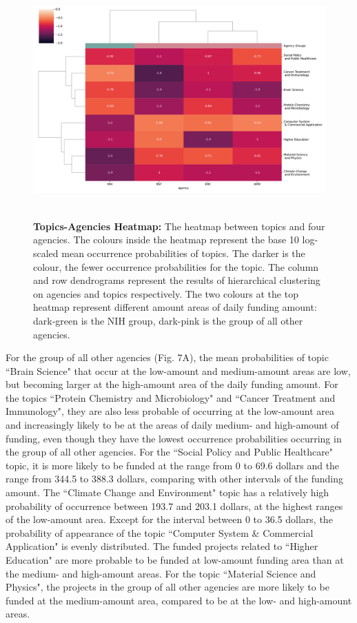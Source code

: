 \begin{figure}[H]
    \centering
    \includegraphics[width = 16cm, height = 9cm]{Code/img/heatmap_agency_topics.pdf}
    \caption[Heatmap between topic and agencies]{\textbf{Topics-Agencies Heatmap:} The heatmap between topics and four agencies. The colours inside the heatmap represent the base 10 log-scaled mean occurrence probabilities of topics. The darker is the colour, the fewer occurrence probabilities for the topic. The column and row dendrograms represent the results of hierarchical clustering on agencies and topics respectively. The two colours at the top heatmap represent different amount areas of daily funding amount: dark-green is the NIH group, dark-pink is the group of all other agencies.}
\end{figure}

For the group of all other agencies (Fig. 7A), the mean probabilities of topic ``Brain Science" that occur at the low-amount and medium-amount areas are low, but becoming larger at the high-amount area of the daily funding amount. For the topics ``Protein Chemistry and Microbiology" and ``Cancer Treatment and Immunology", they are also less probable of occurring at the low-amount area and increasingly likely to be at the areas of daily medium- and high-amount of funding, even though they have the lowest occurrence probabilities occurring in the group of all other agencies. For the ``Social Policy and Public Healthcare" topic, it is more likely to be funded at the range from 0 to 69.6 dollars and the range from 344.5 to 388.3 dollars, comparing with other intervals of the funding amount. The ``Climate Change and Environment" topic has a relatively high probability of occurrence between 193.7 and 203.1 dollars, at the highest ranges of the low-amount area. Except for the interval between 0 to 36.5 dollars, the probability of appearance of the topic ``Computer System \& Commercial Application" is evenly distributed. The funded projects related to ``Higher Education" are more probable to be funded at low-amount funding area than at the medium- and high-amount areas. For the topic ``Material Science and Physics", the projects in the group of all other agencies are more likely to be funded at the medium-amount area, compared to be at the low- and high-amount areas.

